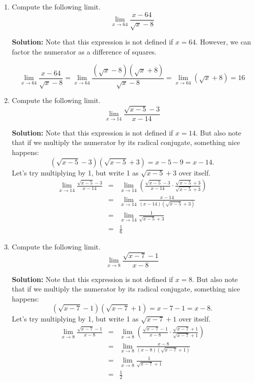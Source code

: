 \documentclass{article}
\begin{document}
\begin{enumerate}
  
\vspace{1cm}

\item Compute the following limit. \[ \lim_{x \rightarrow 64} \frac{x - 64}{\sqrt{x} - 8} \]

\textbf{Solution:} Note that this expression is not defined if $x = 64$. However, we can factor the numerator as a difference of squares.

\[ \lim_{x \rightarrow 64} \frac{x - 64}{\sqrt{x} - 8} = \lim_{x \rightarrow 64} \frac{(\sqrt{x} - 8)(\sqrt{x} + 8)}{\sqrt{x} - 8} = \lim_{x \rightarrow 64} (\sqrt{x} + 8) = 16 \]


  
\vspace{1cm}

\item Compute the following limit. \[ \lim_{x \rightarrow 14} \frac{\sqrt{x - 5} - 3}{x - 14} \]

\textbf{Solution:} Note that this expression is not defined if $x = 14$. But also note that if we multiply the numerator by its radical conjugate, something nice happens:
\[ \left(\sqrt{x - 5} - 3\right)\left(\sqrt{x - 5} + 3\right) = x - 5 - 9 = x - 14. \]
Let's try multiplying by 1, but write 1 as $\sqrt{x - 5} + 3$ over itself.
\begin{eqnarray*}
\lim_{x \rightarrow 14} \frac{\sqrt{x - 5} - 3}{x - 14} & = & \lim_{x \rightarrow 14} \left( \frac{\sqrt{x - 5} - 3}{x - 14} \cdot \frac{\sqrt{x - 5} + 3}{\sqrt{x - 5} + 3} \right) \\
 & = & \lim_{x \rightarrow 14} \frac{x - 14}{(x - 14)(\sqrt{x - 5} + 3)} \\
 & = & \lim_{x \rightarrow 14} \frac{1}{\sqrt{x - 5} + 3} \\
 & = & \frac{1}{6}
\end{eqnarray*}


  
\vspace{1cm}

\item Compute the following limit. \[ \lim_{x \rightarrow 8} \frac{\sqrt{x - 7} - 1}{x - 8} \]

\textbf{Solution:} Note that this expression is not defined if $x = 8$. But also note that if we multiply the numerator by its radical conjugate, something nice happens:
\[ \left(\sqrt{x - 7} - 1\right)\left(\sqrt{x - 7} + 1\right) = x - 7 - 1 = x - 8. \]
Let's try multiplying by 1, but write 1 as $\sqrt{x - 7} + 1$ over itself.
\begin{eqnarray*}
\lim_{x \rightarrow 8} \frac{\sqrt{x - 7} - 1}{x - 8} & = & \lim_{x \rightarrow 8} \left( \frac{\sqrt{x - 7} - 1}{x - 8} \cdot \frac{\sqrt{x - 7} + 1}{\sqrt{x - 7} + 1} \right) \\
 & = & \lim_{x \rightarrow 8} \frac{x - 8}{(x - 8)(\sqrt{x - 7} + 1)} \\
 & = & \lim_{x \rightarrow 8} \frac{1}{\sqrt{x - 7} + 1} \\
 & = & \frac{1}{2}
\end{eqnarray*}



\end{enumerate}
\end{document}

